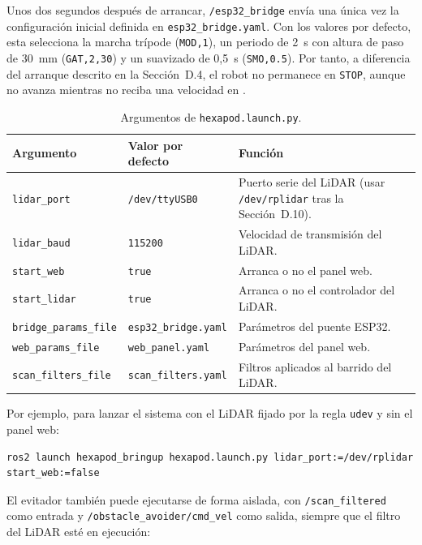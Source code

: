 Unos dos segundos después de arrancar, \texttt{/esp32\_bridge} envía una única
vez la configuración inicial definida en \texttt{esp32\_bridge.yaml}. Con los
valores por defecto, esta selecciona la marcha trípode (\texttt{MOD,1}), un
periodo de 2~s con altura de paso de 30~mm (\texttt{GAT,2,30}) y un suavizado
de 0,5~s (\texttt{SMO,0.5}). Por tanto, a diferencia del arranque descrito en la
Sección~D.4, el robot no permanece en \texttt{STOP}, aunque no avanza mientras
no reciba una velocidad en .

\begin{table}[H]
    \centering
    \footnotesize
    \begin{tabularx}{\textwidth}{@{}l l X@{}}
        \toprule
        \textbf{Argumento} & \textbf{Valor por defecto} & \textbf{Función} \\
        \midrule
        \texttt{lidar\_port} & \texttt{/dev/ttyUSB0} & Puerto serie del LiDAR (usar \texttt{/dev/rplidar} tras la Sección~D.10). \\
        \texttt{lidar\_baud} & \texttt{115200} & Velocidad de transmisión del LiDAR. \\
        \texttt{start\_web} & \texttt{true} & Arranca o no el panel web. \\
        \texttt{start\_lidar} & \texttt{true} & Arranca o no el controlador del LiDAR. \\
        \texttt{bridge\_params\_file} & \texttt{esp32\_bridge.yaml} & Parámetros del puente ESP32. \\
        \texttt{web\_params\_file} & \texttt{web\_panel.yaml} & Parámetros del panel web. \\
        \texttt{scan\_filters\_file} & \texttt{scan\_filters.yaml} & Filtros aplicados al barrido del LiDAR. \\
        \bottomrule
    \end{tabularx}
    \caption{Argumentos de \texttt{hexapod.launch.py}.}
    \label{tab:manual_launch_args}
\end{table}

Por ejemplo, para lanzar el sistema con el LiDAR fijado por la regla
\texttt{udev} y sin el panel web:

\begin{lstlisting}[basicstyle=\ttfamily\small,frame=single,breaklines=true]
ros2 launch hexapod_bringup hexapod.launch.py lidar_port:=/dev/rplidar start_web:=false
\end{lstlisting}

El evitador también puede ejecutarse de forma aislada, con
\texttt{/scan\_filtered} como entrada y \texttt{/obstacle\_avoider/cmd\_vel} como
salida, siempre que el filtro del LiDAR esté en ejecución:

